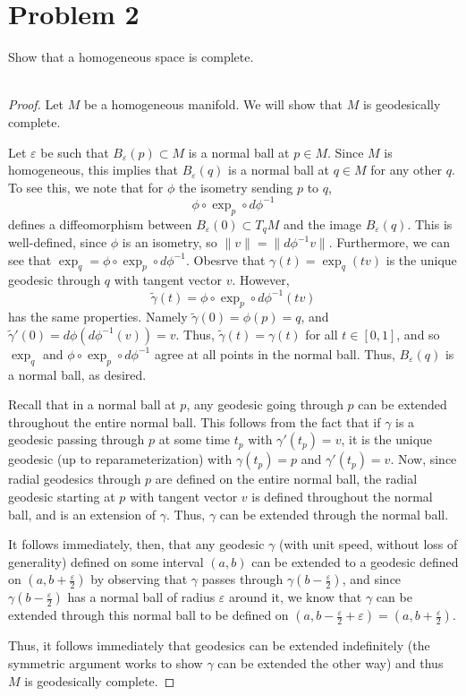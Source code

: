 \documentclass[fontsize=11pt]{scrartcl} %
\numberwithin{equation}{section} %
\numberwithin{figure}{section} %
\numberwithin{table}{section} %
\begin{document}
\section*{Problem 2}
Show that a homogeneous space is complete.
\\
\\
\begin{proof}
    Let $M$ be a homogeneous manifold. We will show that $M$ is geodesically
    complete.

    Let $\varepsilon$ be such that $B_{\varepsilon}(p)\subset M$ is a normal
    ball at $p\in M$. Since $M$ is homogeneous, this implies that
    $B_{\varepsilon}(q)$ is a normal ball at $q\in M$ for any other $q$. 
    To see this, we note that for $\phi$ the isometry sending $p$ to $q$,
    \[
        \phi\circ\exp_p\circ d\phi^{-1}
    \]
    defines a diffeomorphism between $B_{\varepsilon}(0)\subset T_qM$ and the
    image $B_{\varepsilon}(q)$. This is well-defined, since $\phi$ is an
    isometry, so $\|v\| = \|d\phi^{-1}v\|$. Furthermore, we can see that
    $\exp_q=\phi\circ\exp_p\circ d\phi^{-1}$. Obesrve that $\gamma(t) =
    \exp_q(tv)$ is the unique geodesic through $q$ with tangent vector $v$.
    However,
    \[
        \tilde{\gamma}(t) = \phi\circ\exp_p\circ d\phi^{-1}(tv)
    \]
    has the same properties. Namely $\tilde{\gamma}(0) = \phi(p)=q$, and
    $\tilde{\gamma}'(0)= d\phi(d\phi^{-1}(v)) = v$. Thus, $\tilde{\gamma}(t) =
    \gamma(t)$ for all $t\in[0,1]$, and so $\exp_q$ and $\phi\circ\exp_p\circ
    d\phi^{-1}$ agree at all points in the normal ball. Thus,
    $B_{\varepsilon}(q)$ is a normal ball, as desired.

    Recall that in a normal ball at $p$, any geodesic going through $p$ can be
    extended throughout the entire normal ball. This follows from the fact that
    if $\gamma$ is a geodesic passing through $p$ at some time $t_p$ with
    $\gamma'(t_p)=v$, it is the unique geodesic (up to reparameterization) with
    $\gamma(t_p)=p$ and $\gamma'(t_p)=v$. Now, since radial geodesics through
    $p$ are defined on the entire normal ball, the radial geodesic starting at
    $p$ with tangent vector $v$ is defined throughout the normal ball, and is an
    extension of $\gamma$. Thus, $\gamma$ can be extended through the normal
    ball.

    It follows immediately, then, that any geodesic $\gamma$ (with unit speed,
    without loss of generality) defined on some
    interval $(a,b)$ can be extended to a geodesic defined on
    $(a,b+\frac{\varepsilon}{2})$ by observing that $\gamma$ passes through
    $\gamma(b-\frac{\varepsilon}{2})$, and since
    $\gamma(b-\frac{\varepsilon}{2})$ has a normal ball of radius $\varepsilon$
    around it, we know that $\gamma$ can be extended through this normal ball to
    be defined on $(a,b-\frac{\varepsilon}{2} + \varepsilon) =
    (a,b+\frac{\varepsilon}{2})$.

    Thus, it follows immediately that geodesics can be extended indefinitely
    (the symmetric argument works to show $\gamma$ can be extended the other
    way) and thus $M$ is geodesically complete.
\end{proof}
\end{document}
